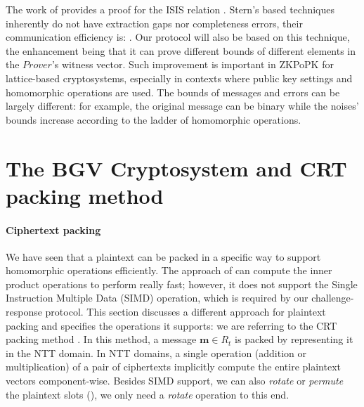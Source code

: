 \begin{description}
  The work of \cite{ling2013improved} provides a proof for the ISIS relation
  .  Stern's based techniques inherently do not have
  extraction gaps nor completeness errors, their communication efficiency is:
  . Our protocol will also be based on this technique, the
  enhancement being that it can prove different bounds of different elements in the
  $Prover$'s witness vector. Such improvement is important in ZKPoPK for
  lattice-based cryptosystems, especially in contexts where public key settings
  and homomorphic operations are used. The bounds of messages and errors can be
  largely different: for example, the original message can be binary while the
  noises' bounds increase according to the ladder of homomorphic operations.

\end{description}




\section{The BGV Cryptosystem and CRT packing method}
\label{sec:6bgv}
\paragraph{Ciphertext packing}

We have seen that a plaintext can be packed in a specific way to support
homomorphic operations efficiently. The approach of \cite{yasuda2014practical}
can compute the inner product operations to perform really fast; however, it does not
support the Single Instruction Multiple Data (SIMD) operation, which is required by
our challenge-response protocol. This section discusses a different approach for
plaintext packing and specifies the operations it supports: we are referring to the CRT packing method
\cite{smart2014fully}. In this method, a message \(\mathbf{m} \in R_{t}\) is
packed by representing it in the NTT domain. In NTT domains, a single operation
(addition or multiplication) of a pair of ciphertexts implicitly compute
the entire plaintext vectors component-wise. Besides SIMD support, we can also
\textit{rotate} or \textit{permute} the plaintext slots
(\cite{gentry2012fully}), we only need a  \textit{rotate} operation to this end.

